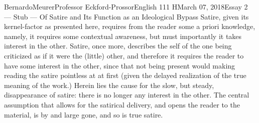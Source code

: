 \documentclass[12pt,letterpaper]{article}
\begin{document}
\begin{mla}{Bernardo}{Meurer}{Professor Eckford-Prossor}{English 111 H}{March 07, 2018}{Essay 2 --- Stub --- Of Satire and Its Function as an Ideological Bypass}
    Satire, given its kernel-factor as presented here, requires from the reader some a priori knowledge, namely, it requires some contextual awareness, but must importantly it takes interest in the other. Satire, once more, describes the self of the one being criticized as if it were the (little) other, and therefore it requires the reader to have some interest in the other, since that not being present would making reading the satire pointless at at first (given the delayed realization of the true meaning of the work.) Herein lies the cause for the slow, but steady, disappearance of satire: there is no longer any interest in the other. The central assumption that allows for the satirical delivery, and opens the reader to the material, is by and large gone, and so is true satire.

\end{mla}
\end{document}
